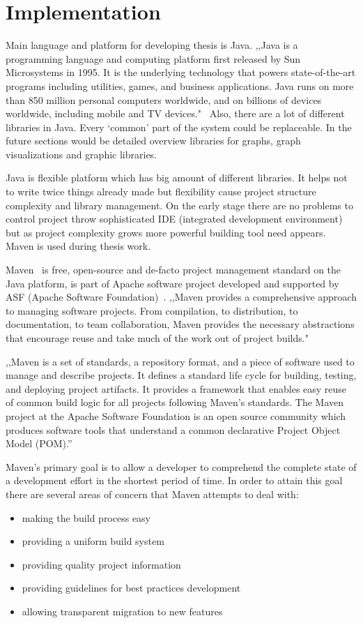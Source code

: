 \section{Implementation}
\label{sec:implementation}
Main language and platform for developing thesis is Java. ,,Java is a programming language and computing platform first released by Sun Microsystems in 1995. It is the underlying technology that powers state-of-the-art programs including utilities, games, and business applications. Java runs on more than 850 million personal computers worldwide, and on billions of devices worldwide, including mobile and TV devices."~\cite{java_com} Also, there are a lot of different libraries in Java. Every `common' part of the system could be replaceable. In the future sections would be detailed overview libraries for graphs, graph visualizations and graphic libraries.


Java is flexible platform which has big amount of different libraries. It helps not to write twice things already made but flexibility cause project structure complexity and library management. On the early stage there are no problems to control project throw sophisticated IDE (integrated development environment) but as project complexity grows more powerful building tool need appears. Maven is used during thesis work.


Maven~\cite{MAVEN_HOME_PAGE} is free, open-source and de-facto project management standard on the Java platform, is part of Apache software project developed and supported by ASF (Apache Software Foundation)~\cite{APACHE_FOUNDATION_HOME_PAGE}. ,,Maven provides a comprehensive approach to managing software projects. From compilation, to distribution, to documentation, to team collaboration, Maven provides the necessary abstractions that encourage reuse and take much of the work out of project builds."~\cite{MAVEN_BOOK_1}


,,Maven is a set of standards, a repository format, and a piece of software used to manage and describe projects. It defines a standard life cycle for building, testing, and deploying project artifacts. It provides a framework that enables easy reuse of common build logic for all projects following Maven's standards. The Maven project at the Apache Software Foundation is an open source community which produces software tools that understand a common declarative Project Object Model (POM).''~\cite{MAVEN_BOOK_2}


Maven's primary goal is to allow a developer to comprehend the complete state of a development effort in the shortest period of time. In order to attain this goal there are several areas of concern that Maven attempts to deal with:
\begin{itemize}
	\item making the build process easy
	\item providing a uniform build system
	\item providing quality project information
	\item providing guidelines for best practices development
	\item allowing transparent migration to new features
\end{itemize}


